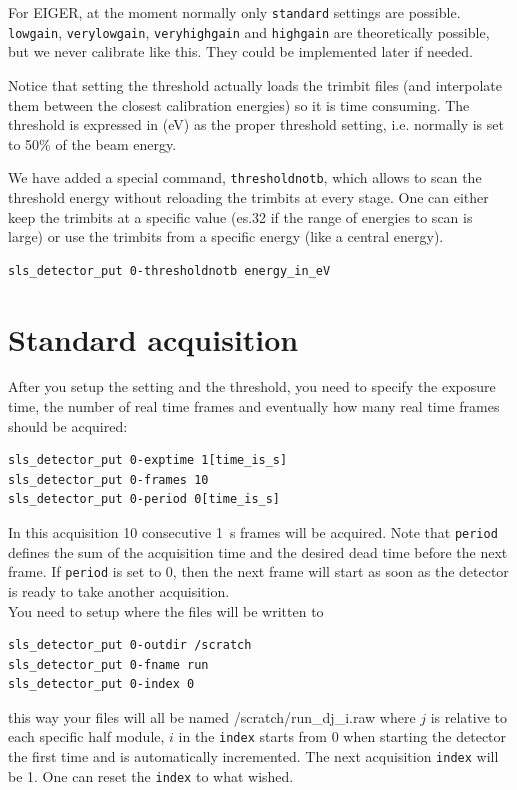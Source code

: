 \documentclass{article}
\newcommand{\E}{EIGER\xspace}
\begin{document}
For \E, at the moment normally only {\tt{standard}} settings are possible.
 {\tt{lowgain}}, {\tt{verylowgain}}, {\tt{veryhighgain}} and {\tt{highgain}} are theoretically possible, but we never calibrate like this. They could be implemented later if needed. 

Notice that setting the threshold actually loads the trimbit files (and interpolate them between the closest calibration energies) so it is time consuming. 
The threshold is expressed in (eV) as the proper threshold setting, i.e. normally is set to 50\% of the beam energy.  

We have added a special command, {\tt{thresholdnotb}}, which allows to scan the threshold energy without reloading the trimbits at every stage. One can either keep the trimbits at a specific value (es.32 if the range of energies to scan is large) or use the trimbits from a specific energy (like a central energy).
\begin{verbatim}
sls_detector_put 0-thresholdnotb energy_in_eV
\end{verbatim}

\section{Standard acquisition}

After you setup the setting and the threshold, you need to specify the exposure time, the number of real time frames and eventually how many real time frames should be acquired:
\begin{verbatim}
sls_detector_put 0-exptime 1[time_is_s]
sls_detector_put 0-frames 10
sls_detector_put 0-period 0[time_is_s]
\end{verbatim}
In this acquisition 10 consecutive 1~s frames will be acquired. Note that {\tt{period}} defines the sum of the acquisition time and the desired dead time before the next frame. If {\tt{period}} is set to 0, then the next frame will start as soon as the detector is ready to take another acquisition. \\


You need to setup where the files will be written to
\begin{verbatim}
sls_detector_put 0-outdir /scratch
sls_detector_put 0-fname run
sls_detector_put 0-index 0
\end{verbatim}
this way your files will all be named /scratch/run\_dj\_i.raw where $j$ is relative to each specific half module, $i$ in the {\tt{index}} starts from 0 when starting the detector the first time and is automatically incremented. The next acquisition {\tt{index}} will be 1. One can reset the  {\tt{index}} to what wished.
\end{document}
